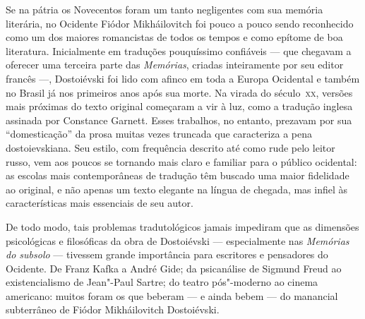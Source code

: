 Se na pátria os Novecentos foram um tanto negligentes com sua memória
literária, no Ocidente Fiódor Mikháilovitch foi pouco a pouco sendo reconhecido
como um dos maiores romancistas de todos os tempos e como epítome de boa
literatura. Inicialmente em traduções pouquíssimo confiáveis --- que chegavam a
oferecer uma terceira parte das \textit{Memórias}, criadas inteiramente por seu
editor francês ---, Dostoiévski foi lido com afinco em toda a Europa Ocidental e
também no Brasil já nos primeiros anos após sua morte. Na virada do século~\textsc{xx},
versões mais próximas do texto original começaram a vir à luz, como a tradução
inglesa assinada por Constance Garnett. Esses trabalhos, no
entanto, prezavam por sua “domesticação” da prosa muitas vezes truncada que
caracteriza a pena dostoievskiana. Seu estilo, com frequência descrito até
como rude pelo leitor russo, vem aos poucos se tornando mais claro e familiar
para o público ocidental: as escolas mais contemporâneas de tradução têm
buscado uma maior fidelidade ao original, e não apenas um texto elegante na
língua de chegada, mas infiel às características mais essenciais de seu autor.

De todo modo, tais problemas tradutológicos jamais impediram que as dimensões
psicológicas e filosóficas da obra de Dostoiévski --- especialmente nas
\textit{Memórias do subsolo} --- tivessem grande importância para escritores e
pensadores do Ocidente. De Franz Kafka a André Gide; da
psicanálise de Sigmund Freud ao existencialismo de Jean"-Paul Sartre; 
do teatro pós"-moderno ao cinema americano: muitos foram os que
beberam --- e ainda bebem --- do manancial subterrâneo de Fiódor Mikháilovitch
Dostoiévski.



